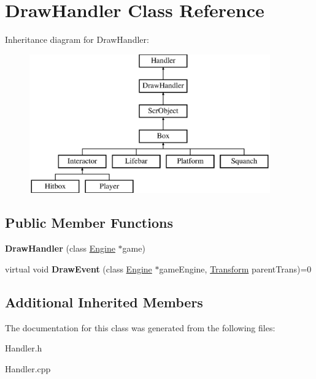 \hypertarget{class_draw_handler}{}\section{Draw\+Handler Class Reference}
\label{class_draw_handler}
Inheritance diagram for Draw\+Handler\+:\begin{figure}[H]
\begin{center}
\leavevmode
\includegraphics[height=6.000000cm]{class_draw_handler}
\end{center}
\end{figure}
\subsection*{Public Member Functions}
\begin{DoxyCompactItemize}
\item 
\hypertarget{class_draw_handler_a4bb69706083b6813cadfda8d3f7e0806}{}\label{class_draw_handler_a4bb69706083b6813cadfda8d3f7e0806} 
{\bfseries Draw\+Handler} (class \hyperlink{class_engine}{Engine} $\ast$game)
\item 
\hypertarget{class_draw_handler_a6ea4ba475a611834760c4dd5bb7313fe}{}\label{class_draw_handler_a6ea4ba475a611834760c4dd5bb7313fe} 
virtual void {\bfseries Draw\+Event} (class \hyperlink{class_engine}{Engine} $\ast$game\+Engine, \hyperlink{class_transform}{Transform} parent\+Trans)=0
\end{DoxyCompactItemize}
\subsection*{Additional Inherited Members}


The documentation for this class was generated from the following files\+:\begin{DoxyCompactItemize}
\item 
Handler.\+h\item 
Handler.\+cpp\end{DoxyCompactItemize}
